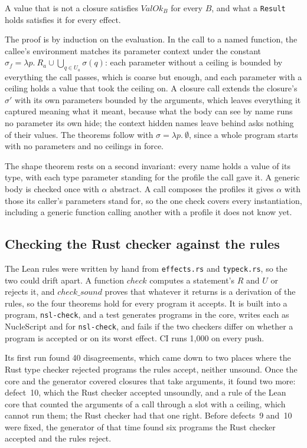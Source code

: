 \documentclass[11pt,a4paper]{article}
\newcommand{\nsl}[1]{\texttt{#1}}
\begin{document}
A value that is not a closure satisfies $\mathit{ValOk}_B$ for every
$B$, and what a \nsl{Result} holds satisfies it for every effect.

The proof is by induction on the evaluation. In the call to a named
function, the callee's environment matches its parameter context under
the constant $\sigma_f = \lambda p.\ R_a \cup \bigcup_{q \in U_a}
\sigma(q)$: each parameter without a ceiling is bounded by everything the
call passes, which is coarse but enough, and each parameter with a
ceiling holds a value that took the ceiling on. A closure call extends
the closure's $\sigma'$ with its own parameters bounded by the arguments,
which leaves everything it captured meaning what it meant, because what
the body can see by name runs no parameter its own hide; the context
hidden names leave behind asks nothing of their values. The theorems
follow with $\sigma = \lambda p.\ \emptyset$, since a whole program
starts with no parameters and no ceilings in force.

The shape theorem rests on a second invariant: every name holds a value
of its type, with each type parameter standing for the profile the call
gave it. A generic body is checked once with $\alpha$ abstract. A call
composes the profiles it gives $\alpha$ with those its caller's
parameters stand for, so the one check covers every instantiation,
including a generic function calling another with a profile it does not
know yet.

\subsection{Checking the Rust checker against the rules}
\label{sec:compare}

The Lean rules were written by hand from \nsl{effects.rs} and
\nsl{typeck.rs}, so the two could drift apart. A function
$\mathit{check}$ computes a statement's $R$ and $U$ or rejects it, and
$\mathit{check\_sound}$ proves that whatever it returns is a derivation of
the rules, so the four theorems hold for every program it accepts. It is
built into a program, \texttt{nsl-check}, and a test generates programs
in the core, writes each as NucleScript and for \texttt{nsl-check}, and
fails if the two checkers differ on whether a program is accepted or on
its worst effect. CI runs 1,000 on every push.

Its first run found 40 disagreements, which came down to two places where
the Rust type checker rejected programs the rules accept, neither
unsound. Once the core and the generator covered closures that take
arguments, it found two more: defect~10, which the Rust checker accepted
unsoundly, and a rule of the Lean core that counted the arguments of a
call through a slot with a ceiling, which cannot run them; the Rust
checker had that one right. Before defects~9 and~10 were fixed, the
generator of that time found six programs the Rust checker accepted and
the rules reject.
\end{document}
